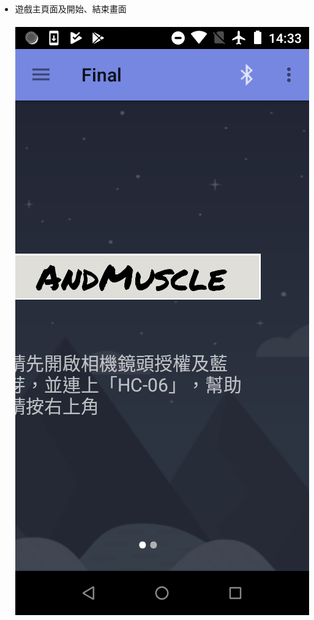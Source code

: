 \documentclass[a0paper,portrait]{baposter}
\begin{document}
\begin{poster}
{\begin{itemize}
\item 遊戲主頁面及開始、結束畫面 \\ \\
\includegraphics[scale=0.15]{game01.png} 
\space \space

\end{itemize}}
\end{poster}
\end{document}
